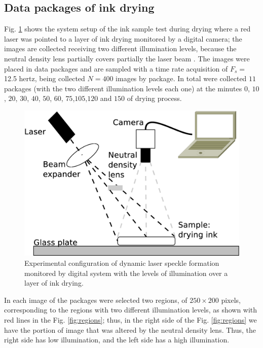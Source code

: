 \documentclass[review]{elsarticle}
\begin{document}
\subsection{Data packages of ink drying}
\label{sec:descriptionink}
Fig. \ref{fig:system} shows the system setup of the ink sample test during drying where
a red laser was pointed to a layer of ink drying monitored by a digital camera;
the images are collected receiving two different illumination levels, 
because the neutral density lens partially covers partially the laser beam \cite{REIS2016}.
The images were placed in data packages and
are sampled with a time rate acquisition of $F_s=$ 12.5 hertz, being 
collected $N=400$ images by package. In total were collected $11$ packages 
(with the two different illumination levels each one) at the minutes 
$0$, $10$, $20$, $30$, $40$, $50$, $60$, $75$,$105$,$120$ and $150$ of drying process. 
\begin{figure}[ht!]
\centering
\includegraphics[width=0.65\columnwidth]{system.eps}
\caption{Experimental configuration of dynamic laser speckle formation monitored by digital system 
with the levels of illumination over a layer of ink drying.}
\label{fig:system}
\end{figure}
In each image of the packages were selected two regions, of $250\times200$ pixels, 
corresponding to the regions with two different illumination levels, 
as shown with red lines in the Fig. \ref{fig:regions}; thus, 
in the right side of the Fig. \ref{fig:regions}  we have the
portion of image that was altered by the neutral density lens.
Thus, the right side has low illumination, and
the left side has a high illumination.
\end{document}
